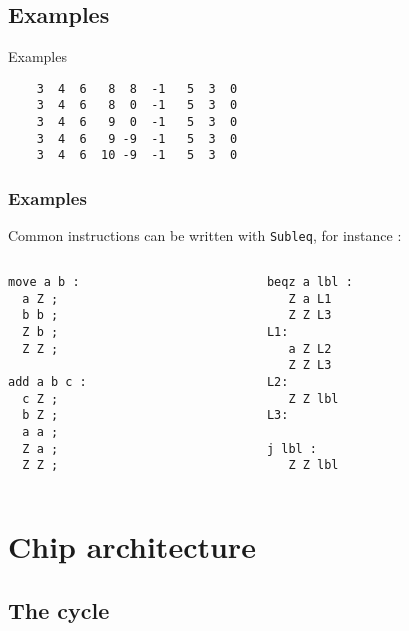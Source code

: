 \documentclass{beamer}
\begin{document}
\subsection{Examples}
\begin{frame}[fragile]{Examples}
  \begin{verbatim}
    3  4  6   8  8  -1   5  3  0
    3  4  6   8  0  -1   5  3  0
    3  4  6   9  0  -1   5  3  0
    3  4  6   9 -9  -1   5  3  0
    3  4  6  10 -9  -1   5  3  0
  \end{verbatim}
\end{frame}

\begin{frame}[fragile]
    \frametitle{Examples}
Common instructions can be written with \texttt{Subleq}, for instance :

\begin{columns}[t]
    \begin{column}[T]{3cm}
\begin{verbatim}
move a b :
  a Z ;
  b b ;
  Z b ;
  Z Z ;

add a b c :
  c Z ;
  b Z ;
  a a ;
  Z a ;
  Z Z ;
\end{verbatim}
    \end{column}
\begin{column}[T]{3cm}
\begin{verbatim}
beqz a lbl :
   Z a L1
   Z Z L3
L1:
   a Z L2
   Z Z L3
L2:
   Z Z lbl
L3:

j lbl :
   Z Z lbl
\end{verbatim}
\end{column}
\end{columns}
\end{frame}

\section{Chip architecture}
\subsection{The cycle}
\end{document}
